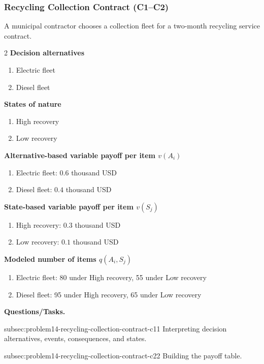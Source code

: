 	\subsubsection{Recycling Collection Contract (C1--C2)}
	\label{sec:problem14-recycling-collection-contract-c1-c2}
	A municipal contractor chooses a collection fleet for a two-month recycling service contract.
	\begin{multicols}{2}
	\textbf{Decision alternatives}
	\begin{enumerate}[label=\arabic*.]
\item Electric fleet
\item Diesel fleet
	\end{enumerate}
	\textbf{States of nature}
	\begin{enumerate}[label=\arabic*.]
\item High recovery
\item Low recovery
	\end{enumerate}
	\columnbreak
	\textbf{Alternative-based variable payoff per item $v(A_i)$}
\begin{enumerate}[label=\arabic*.]
\item Electric fleet: $0.6$ thousand USD
\item Diesel fleet: $0.4$ thousand USD\end{enumerate}
\textbf{State-based variable payoff per item $v(S_j)$}
\begin{enumerate}[label=\arabic*.]
\item High recovery: $0.3$ thousand USD
\item Low recovery: $0.1$ thousand USD\end{enumerate}
\textbf{Modeled number of items $q(A_i,S_j)$}
\begin{enumerate}[label=\arabic*.]
\item Electric fleet: 80 under High recovery, 55 under Low recovery
\item Diesel fleet: 95 under High recovery, 65 under Low recovery
\end{enumerate}
	\end{multicols}

	\textbf{Questions/Tasks.}
	\begin{enumerate}
	\CriterionTask
	{subsec:problem14-recycling-collection-contract-c1}{1}
	{Interpreting decision alternatives, events, consequences, and states.}

	\CriterionTask
	{subsec:problem14-recycling-collection-contract-c2}{2}
	{Building the payoff table.}
	\end{enumerate}

